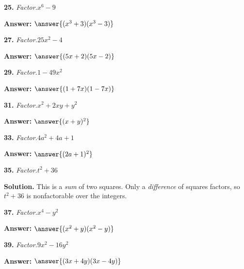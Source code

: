 \documentclass{ximera}
\begin{document}
\begin{problem}
\textbf{25.} \emph{Factor.}\quad $x^6 - 9$

\textbf{Answer:} $\answer{(x^3 +3)(x^3 -3)}$
\end{problem}

\begin{problem}
\textbf{27.} \emph{Factor.}\quad $25x^2 - 4$

\textbf{Answer:} $\answer{(5x +2)(5x -2)}$
\end{problem}

\begin{problem}
\textbf{29.} \emph{Factor.}\quad $1 - 49x^2$

\textbf{Answer:} $\answer{(1 +7x)(1 -7x)}$
\end{problem}

\begin{problem}
\textbf{31.} \emph{Factor.}\quad $x^2 + 2xy + y^2$

\textbf{Answer:} $\answer{(x +y)^2}$
\end{problem}

\begin{problem}
\textbf{33.} \emph{Factor.}\quad $4a^2 + 4a + 1$

\textbf{Answer:} $\answer{(2a +1)^2}$
\end{problem}

\begin{problem}
\textbf{35.} \emph{Factor.}\quad $t^2 + 36$

\begin{multipleChoice}
\end{multipleChoice}

\begin{hint}
\textbf{Solution.} This is a \emph{sum} of two squares. Only a \emph{difference} of squares factors, so $t^2+36$ is nonfactorable over the integers.
\end{hint}
\end{problem}

\begin{problem}
\textbf{37.} \emph{Factor.}\quad $x^4 - y^2$

\textbf{Answer:} $\answer{(x^2 +y)(x^2 -y)}$
\end{problem}

\begin{problem}
\textbf{39.} \emph{Factor.}\quad $9x^2 - 16y^2$

\textbf{Answer:} $\answer{(3x +4y)(3x -4y)}$
\end{problem}
\end{document}
